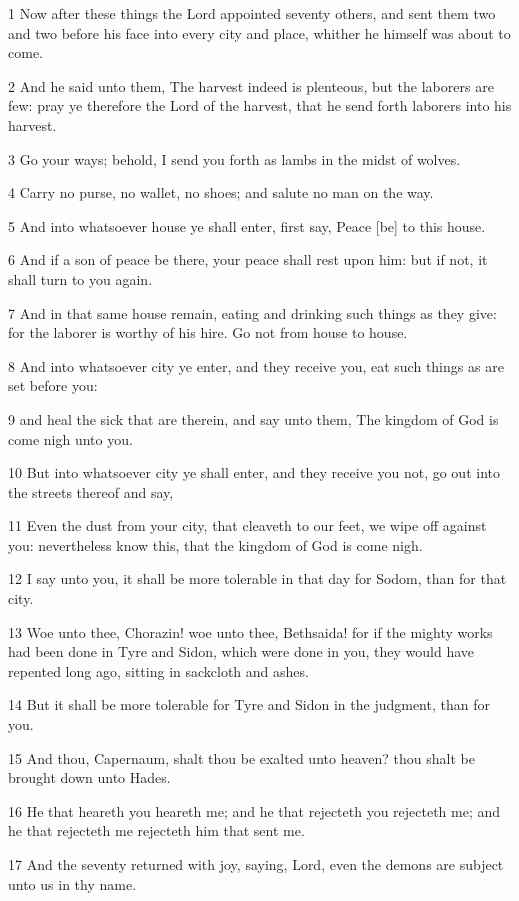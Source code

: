 \par 1 Now after these things the Lord appointed seventy others, and sent them two and two before his face into every city and place, whither he himself was about to come.
\par 2 And he said unto them, The harvest indeed is plenteous, but the laborers are few: pray ye therefore the Lord of the harvest, that he send forth laborers into his harvest.
\par 3 Go your ways; behold, I send you forth as lambs in the midst of wolves.
\par 4 Carry no purse, no wallet, no shoes; and salute no man on the way.
\par 5 And into whatsoever house ye shall enter, first say, Peace [be] to this house.
\par 6 And if a son of peace be there, your peace shall rest upon him: but if not, it shall turn to you again.
\par 7 And in that same house remain, eating and drinking such things as they give: for the laborer is worthy of his hire. Go not from house to house.
\par 8 And into whatsoever city ye enter, and they receive you, eat such things as are set before you:
\par 9 and heal the sick that are therein, and say unto them, The kingdom of God is come nigh unto you.
\par 10 But into whatsoever city ye shall enter, and they receive you not, go out into the streets thereof and say,
\par 11 Even the dust from your city, that cleaveth to our feet, we wipe off against you: nevertheless know this, that the kingdom of God is come nigh.
\par 12 I say unto you, it shall be more tolerable in that day for Sodom, than for that city.
\par 13 Woe unto thee, Chorazin! woe unto thee, Bethsaida! for if the mighty works had been done in Tyre and Sidon, which were done in you, they would have repented long ago, sitting in sackcloth and ashes.
\par 14 But it shall be more tolerable for Tyre and Sidon in the judgment, than for you.
\par 15 And thou, Capernaum, shalt thou be exalted unto heaven? thou shalt be brought down unto Hades.
\par 16 He that heareth you heareth me; and he that rejecteth you rejecteth me; and he that rejecteth me rejecteth him that sent me.
\par 17 And the seventy returned with joy, saying, Lord, even the demons are subject unto us in thy name.
